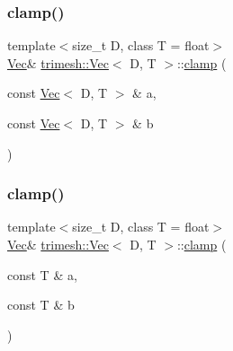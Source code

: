 \mbox{\label{classtrimesh_1_1Vec_a34c4f6234606c33fa5f4e827de362dc2}} 
\subsubsection{\texorpdfstring{clamp()}{clamp()}\hspace{0.1cm}{\footnotesize\ttfamily [1/2]}}
{\footnotesize\ttfamily template$<$size\+\_\+t D, class T = float$>$ \\
\hyperlink{classtrimesh_1_1Vec}{Vec}\& \hyperlink{classtrimesh_1_1Vec}{trimesh\+::\+Vec}$<$ D, T $>$\+::\hyperlink{namespacetrimesh_add94ef6721eddee12fecac8a43c8a912}{clamp} (\begin{DoxyParamCaption}\item[{const \hyperlink{classtrimesh_1_1Vec}{Vec}$<$ D, T $>$ \&}]{a,  }\item[{const \hyperlink{classtrimesh_1_1Vec}{Vec}$<$ D, T $>$ \&}]{b }\end{DoxyParamCaption})\hspace{0.3cm}{\ttfamily [inline]}}

\mbox{\label{classtrimesh_1_1Vec_a703f0f41eb50298f33bf85e768eccbbe}} 
\subsubsection{\texorpdfstring{clamp()}{clamp()}\hspace{0.1cm}{\footnotesize\ttfamily [2/2]}}
{\footnotesize\ttfamily template$<$size\+\_\+t D, class T = float$>$ \\
\hyperlink{classtrimesh_1_1Vec}{Vec}\& \hyperlink{classtrimesh_1_1Vec}{trimesh\+::\+Vec}$<$ D, T $>$\+::\hyperlink{namespacetrimesh_add94ef6721eddee12fecac8a43c8a912}{clamp} (\begin{DoxyParamCaption}\item[{const T \&}]{a,  }\item[{const T \&}]{b }\end{DoxyParamCaption})\hspace{0.3cm}{\ttfamily [inline]}}

\mbox{\label{classtrimesh_1_1Vec_ae6f4ee2f93b293f9382b0ee66993cc72}} 

